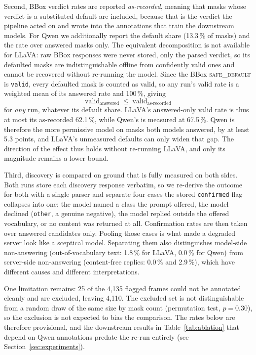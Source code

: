 \documentclass[conference]{IEEEtran}
\begin{document}
Second, BBox verdict rates are reported \emph{as-recorded}, meaning that masks whose verdict is a substituted default are included, because that is the verdict the pipeline acted on and wrote into the annotations that train the downstream models.
For Qwen we additionally report the default share (13.3\,\% of masks) and the rate over answered masks only.
The equivalent decomposition is not available for LLaVA: raw BBox responses were never stored, only the parsed verdict, so its defaulted masks are indistinguishable offline from confidently valid ones and cannot be recovered without re-running the model.
Since the BBox \textsc{safe\_default} is \texttt{valid}, every defaulted mask is counted as valid, so any run's valid rate is a weighted mean of its answered rate and 100\,\%, giving
\begin{equation}
\text{valid}_{\text{answered}} \;\leq\; \text{valid}_{\text{as-recorded}}
\label{eq:default_bound}
\end{equation}
for \emph{any} run, whatever its default share.
LLaVA's answered-only valid rate is thus at most its as-recorded 62.1\,\%, while Qwen's is measured at 67.5\,\%.
Qwen is therefore the more permissive model on masks both models answered, by at least 5.3 points, and LLaVA's unmeasured defaults can only widen that gap.
The direction of the effect thus holds without re-running LLaVA, and only its magnitude remains a lower bound.

Third, discovery is compared on ground that is fully measured on both sides.
Both runs store each discovery response verbatim, so we re-derive the outcome for both with a single parser and separate four cases the stored \texttt{confirmed} flag collapses into one: the model named a class the prompt offered, the model declined (\texttt{other}, a genuine negative), the model replied outside the offered vocabulary, or no content was returned at all.
Confirmation rates are then taken over answered candidates only.
Pooling those cases is what made a degraded server look like a sceptical model.
Separating them also distinguishes model-side non-answering (out-of-vocabulary text: 1.8\,\% for LLaVA, 0.0\,\% for Qwen) from server-side non-answering (content-free replies: 0.0\,\% and 2.9\,\%), which have different causes and different interpretations.

One limitation remains: 25 of the 4{,}135 flagged frames could not be annotated cleanly and are excluded, leaving 4{,}110. The excluded set is not distinguishable from a random draw of the same size by mask count (permutation test, $p{=}0.30$), so the exclusion is not expected to bias the comparison.
The rates below are therefore provisional, and the downstream results in Table~\ref{tab:ablation} that depend on Qwen annotations predate the re-run entirely (see Section~\ref{sec:experiments}).
\end{document}
